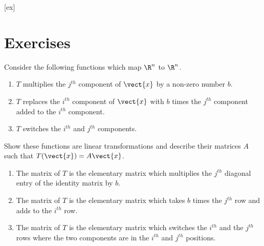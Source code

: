 [ex]
\section*{Exercises}

\begin{enumialphparenastyle}

\begin{ex} \label{exer-linear-transf}
Consider the following functions which map $\R^{n}$ to $\R^{n}$. 

\begin{enumerate}
\item $T$ multiplies the $j^{th}$ component of $\vect{x}$ by a non-zero
number $b$.

\item $T$ replaces the $i^{th}$ component of $\vect{x}$ with $b$ times the
$j^{th}$ component added to the $i^{th}$ component.

\item $T$ switches the $i^{th}$ and $j^{th}$ components.
\end{enumerate}

Show these functions are linear transformations and describe their matrices $A$ such that $T(\vect{x}) = A\vect{x}$.
\begin{sol}
\begin{enumerate}
\item The matrix of $T$ is the elementary matrix which multiplies
the $j^{th}$ diagonal entry of the identity matrix by $b$.
\item The matrix of $T$ is the
elementary matrix which takes $b$ times the $j^{th}$ row and adds to the $%
i^{th}$ row.
\item The matrix of $T$ is the elementary matrix which switches the $%
i^{th}$ and the $j^{th}$ rows where the two components are in the $i^{th}$
and $j^{th}$ positions.
\end{enumerate}
\end{sol}
\end{ex}


\end{enumialphparenastyle}
